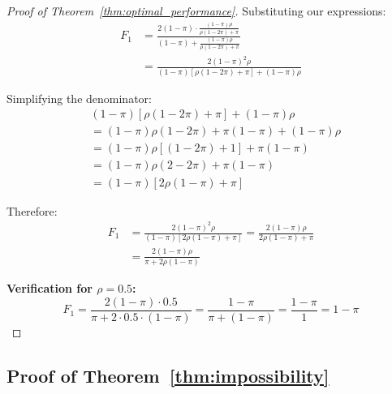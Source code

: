 \documentclass{article}
\theoremstyle{plain}
\theoremstyle{definition}
\theoremstyle{remark}
\begin{document}
\begin{proof}[Proof of Theorem~\ref{thm:optimal_performance}]
Substituting our expressions:
\begin{align}
F_1 &= \frac{2(1-\pi) \cdot \frac{(1-\pi)\rho}{\rho(1-2\pi) + \pi}}{(1-\pi) + \frac{(1-\pi)\rho}{\rho(1-2\pi) + \pi}} \nonumber \\
&= \frac{2(1-\pi)^2\rho}{(1-\pi)[\rho(1-2\pi) + \pi] + (1-\pi)\rho}
\end{align}

Simplifying the denominator:
\begin{align}
&(1-\pi)[\rho(1-2\pi) + \pi] + (1-\pi)\rho \nonumber \\
&= (1-\pi)\rho(1-2\pi) + \pi(1-\pi) + (1-\pi)\rho \nonumber \\
&= (1-\pi)\rho[(1-2\pi) + 1] + \pi(1-\pi) \nonumber \\
&= (1-\pi)\rho(2-2\pi) + \pi(1-\pi) \nonumber \\
&= (1-\pi)[2\rho(1-\pi) + \pi]
\end{align}

Therefore:
\begin{align}
F_1 &= \frac{2(1-\pi)^2\rho}{(1-\pi)[2\rho(1-\pi) + \pi]} = \frac{2(1-\pi)\rho}{2\rho(1-\pi) + \pi} \nonumber \\
&= \frac{2(1-\pi)\rho}{\pi + 2\rho(1-\pi)}
\end{align}

\textbf{Verification for $\rho = 0.5$:}
\begin{equation}
F_1 = \frac{2(1-\pi) \cdot 0.5}{\pi + 2 \cdot 0.5 \cdot (1-\pi)} = \frac{1-\pi}{\pi + (1-\pi)} = \frac{1-\pi}{1} = 1 - \pi
\end{equation}

\end{proof}

\subsection{Proof of Theorem~\ref{thm:impossibility}}
\label{appendix:proof_impossibility}
\end{document}
